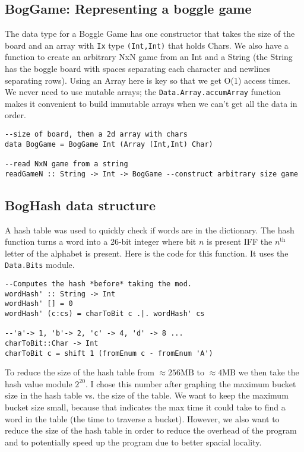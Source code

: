 \documentclass{article}
\newcommand{\tm}[1]{\textrm{#1}}
\begin{document}
\subsection{BogGame: Representing a boggle game} 
The data type for a Boggle Game has one constructor that takes the size of the board and an array with \verb=Ix= type \verb=(Int,Int)= that holds Chars. We also have a function to create an arbitrary NxN game from an Int and a String (the String has the boggle board with spaces separating each character and newlines separating rows). Using an Array here is key so that we get O(1) access times. We never need to use mutable arrays; the \verb=Data.Array.accumArray= function makes it convenient to build immutable arrays when we can't get all the data in order.

\begin{lstlisting}
--size of board, then a 2d array with chars
data BogGame = BogGame Int (Array (Int,Int) Char)

--read NxN game from a string
readGameN :: String -> Int -> BogGame --construct arbitrary size game
\end{lstlisting}

\subsection{BogHash data structure}
A hash table was used to quickly check if words are in the dictionary. The hash function turns a word into a 26-bit integer where bit $n$ is present IFF the $n^{\tm{th}}$ letter of the alphabet is present. Here is the code for this function. It uses the \verb=Data.Bits= module.

\begin{lstlisting}
--Computes the hash *before* taking the mod.
wordHash' :: String -> Int 
wordHash' [] = 0
wordHash' (c:cs) = charToBit c .|. wordHash' cs

--'a'-> 1, 'b'-> 2, 'c' -> 4, 'd' -> 8 ...
charToBit::Char -> Int
charToBit c = shift 1 (fromEnum c - fromEnum 'A')
\end{lstlisting}

To reduce the size of the hash table from $\approx 256 \tm{MB}$ to $\approx 4 \tm{MB}$ we then take the hash value module $2^{20}$. I chose this number after graphing the maximum bucket size in the hash table vs. the size of the table. We want to keep the maximum bucket size small, because that indicates the max time it could take to find a word in the table (the time to traverse a bucket). However, we also want to reduce the size of the hash table in order to reduce the overhead of the program and to potentially speed up the program due to better spacial locality. 
\end{document}
